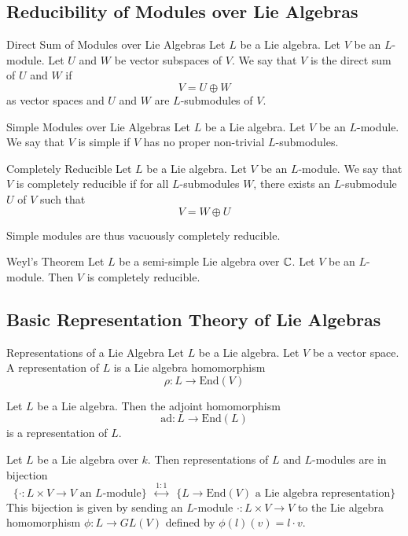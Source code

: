\documentclass[a4paper]{article}
\begin{document}
\subsection{Reducibility of Modules over Lie Algebras}
\begin{defn}{Direct Sum of Modules over Lie Algebras}{} Let $L$ be a Lie algebra. Let $V$ be an $L$-module. Let $U$ and $W$ be vector subspaces of $V$. We say that $V$ is the direct sum of $U$ and $W$ if $$V=U\oplus W$$ as vector spaces and $U$ and $W$ are $L$-submodules of $V$. 
\end{defn}

\begin{defn}{Simple Modules over Lie Algebras}{} Let $L$ be a Lie algebra. Let $V$ be an $L$-module. We say that $V$ is simple if $V$ has no proper non-trivial $L$-submodules. 
\end{defn}

\begin{defn}{Completely Reducible}{} Let $L$ be a Lie algebra. Let $V$ be an $L$-module. We say that $V$ is completely reducible if for all $L$-submodules $W$, there exists an $L$-submodule $U$ of $V$ such that $$V=W\oplus U$$
\end{defn}

Simple modules are thus vacuously completely reducible. 

\begin{thm}{Weyl's Theorem}{} Let $L$ be a semi-simple Lie algebra over $\mathbb{C}$. Let $V$ be an $L$-module. Then $V$ is completely reducible. 
\end{thm}

\subsection{Basic Representation Theory of Lie Algebras}
\begin{defn}{Representations of a Lie Algebra}{} Let $L$ be a Lie algebra. Let $V$ be a vector space. A representation of $L$ is a Lie algebra homomorphism $$\rho:L\to\text{End}(V)$$
\end{defn}

\begin{lmm}{}{} Let $L$ be a Lie algebra. Then the adjoint homomorphism $$\text{ad}:L\to\text{End}(L)$$ is a representation of $L$. 
\end{lmm}

\begin{prp}{}{} Let $L$ be a Lie algebra over $k$. Then representations of $L$ and $L$-modules are in bijection $$\{\cdot:L\times V\to V\text{ an }L\text{-module}\}\;\;\overset{1:1}{\leftrightarrow}\;\;\{L\to\text{End}(V)\text{ a Lie algebra representation}\}$$ This bijection is given by sending an $L$-module $\cdot:L\times V\to V$ to the Lie algebra homomorphism $\phi:L\to GL(V)$ defined by $\phi(l)(v)=l\cdot v$. 
\end{prp}
\end{document}
